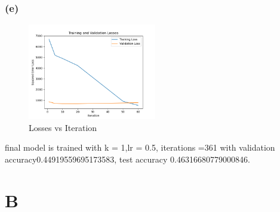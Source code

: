 \documentclass{article}
\begin{document}
\subsubsection*{(e)}
\begin{figure}[h]
\centering
\includegraphics[width=0.5\textwidth]{losses vs iteration.png}
\caption{Losses vs Iteration}
\end{figure}
final model is trained with k = 1,lr = 0.5, iterations =361 with validation accuracy0.44919559695173583, test accuracy 0.46316680779000846.\\

\section*{B}
\end{document}
